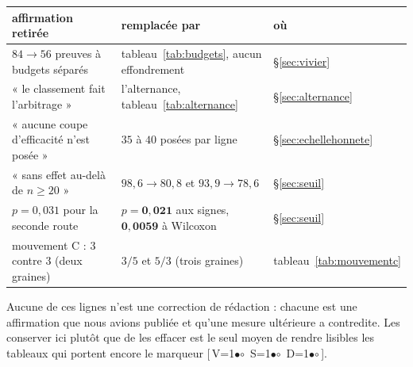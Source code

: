 \documentclass[11pt,a4paper]{article}
\theoremstyle{plain}
\theoremstyle{remark}
\newcommand{\cfgm}[1]{\ifnum#1=1$\bullet$\else$\circ$\fi}
\newcommand{\conf}[3]{%
  \textsf{\footnotesize[\,V\cfgm{#1}\ S\cfgm{#2}\ D\cfgm{#3}\,]}}
\begin{document}
\begin{center}
\setlength{\tabcolsep}{4pt}\small
\begin{tabular}{lll}
\toprule
affirmation retirée & remplacée par & où\\
\midrule
$84\to 56$ preuves à budgets séparés
  & tableau~\ref{tab:budgets}, aucun effondrement & \S\ref{sec:vivier}\\
« le classement fait l'arbitrage »
  & l'alternance, tableau~\ref{tab:alternance} & \S\ref{sec:alternance}\\
« aucune coupe d'efficacité n'est posée »
  & $35$ à $40$ posées par ligne & \S\ref{sec:echellehonnete}\\
« sans effet au-delà de $n\ge 20$ »
  & $98{,}6\to 80{,}8$ et $93{,}9\to 78{,}6$ & \S\ref{sec:seuil}\\
$p=0{,}031$ pour la seconde route
  & $p=\mathbf{0{,}021}$ aux signes, $\mathbf{0{,}0059}$ à Wilcoxon
    & \S\ref{sec:seuil}\\
mouvement C : $3$ contre $3$ (deux graines)
  & $3/5$ et $5/3$ (trois graines) & tableau~\ref{tab:mouvementc}\\
\bottomrule
\end{tabular}
\end{center}

\noindent
Aucune de ces lignes n'est une correction de rédaction : chacune est une
affirmation que nous avions publiée et qu'une mesure ultérieure a
contredite. Les conserver ici plutôt que de les effacer est le seul moyen
de rendre lisibles les tableaux qui portent encore le marqueur
\conf{0}{0}{0}.
\end{document}
